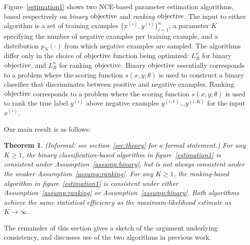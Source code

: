\documentclass[11pt,a4paper]{article}
\newcommand{\str}[3]{s(#1, #2; #3)}
\newtheorem{theorem}{Theorem}[section]
\newcommand{\loss}{\hbox{objective}}
\begin{document}
Figure~\ref{estimation1} shows two NCE-based parameter estimation
algorithms, based respectively on {\em binary $\loss$} and {\em ranking
  $\loss$}. The input to either algorithm is a set of training
examples $\{x^{(i)}, y^{(i)}\}_{i=1}^n$, a parameter $K$ specifying
the number of negative examples per training example, and a
distribution $p_N(\cdot)$ from which negative examples are
sampled. The algorithms differ only in the choice of $\loss$ function
being optimized: $L^n_B$ for binary $\loss$, and $L^n_R$ for ranking
$\loss$. Binary $\loss$ essentially corresponds to a problem where the
scoring function $\str{x}{y}{\theta}$ is used to construct a binary
classifier that discriminates between
positive and negative examples. Ranking $\loss$ corresponds to a problem
where the scoring function $\str{x}{y}{\theta}$ is used to rank the
true label $y^{(i)}$ above negative examples $y^{(i, 1)} \ldots y^{(i, K)}$
for the input $x^{(i)}$. 

Our main result is as follows:



\begin{theorem}(Informal: see section~\ref{sec:theory} for a formal statement.)
For any $K \geq 1$, the binary classification-based algorithm in
figure~\ref{estimation1} is consistent under
Assumption~\ref{assump:binary}, but is not always consistent under the
weaker Assumption~\ref{assump:ranking}. For any $K \geq 1$, the
ranking-based algorithm in figure~\ref{estimation1} is consistent under
either Assumption~\ref{assump:ranking} or
Assumption~\ref{assump:binary}. Both algorithms achieve the same
statistical efficiency as the maximum-likelihood estimate as $K \rightarrow
\infty$.
\end{theorem}


The remainder of this section gives a sketch of the argument
underlying consistency, and discusses use of the two
algorithms in previous work.
\end{document}

